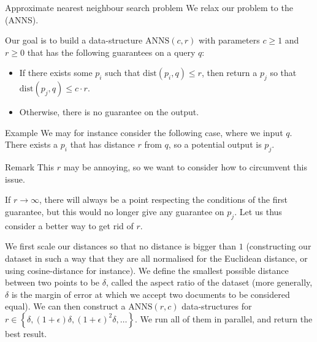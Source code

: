 \documentclass[a4paper]{article}
\begin{document}
\begin{parag}{Approximate nearest neighbour search problem}
    We relax our problem to the  (ANNS).

    Our goal is to build a data-structure $\text{ANNS}\left(c, r\right)$ with parameters $c \geq 1$ and $r \geq 0$ that has the following guarantees on a query $q$:
    \begin{itemize}
        \item If there exists some $p_i$ such that $\text{dist}\left(p_i, q\right) \leq r$, then return a $p_j$ so that $\text{dist}\left(p_j, q\right) \leq c\cdot r$.
        \item Otherwise, there is no guarantee on the output.
    \end{itemize}

    \begin{subparag}{Example}
        We may for instance consider the following case, where we input $q$. There exists a $p_i$ that has distance $r$ from $q$, so a potential output is $p_j$.
    \end{subparag}

    \begin{subparag}{Remark}
        This $r$ may be annoying, so we want to consider how to circumvent this issue.
        
        If $r \to \infty$, there will always be a point respecting the conditions of the first guarantee, but this would no longer give any guarantee on $p_j$. Let us thus consider a better way to get rid of $r$.

        We first scale our distances so that no distance is bigger than $1$ (constructing our dataset in such a way that they are all normalised for the Euclidean distance, or using cosine-distance for instance). We define the smallest possible distance between two points to be $\delta$, called the aspect ratio of the dataset (more generally, $\delta$ is the margin of error at which we accept two documents to be considered equal). We can then construct a $\text{ANNS}\left(r, c\right)$ data-structures for $r \in \left\{\delta, \left(1 + \epsilon\right) \delta, \left(1 + \epsilon\right)^2 \delta, \ldots\right\}$. We run all of them in parallel, and return the best result.
    \end{subparag}
\end{parag}
\end{document}
